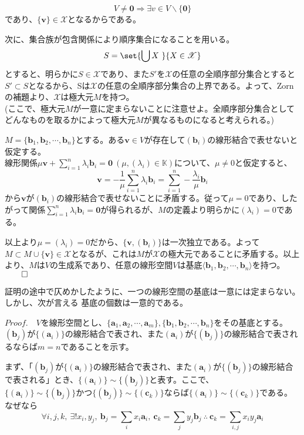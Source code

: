 \documentclass[dvipdfmx]{jsarticle}
\begin{document}
\[V\neq\bm{0}\Rightarrow\exists v \in V\backslash\{\bm{0}\}\]
であり、$\{\bm{v}\}\in\mathscr{X}$となるからである。\par
次に、集合族が包含関係により順序集合になることを用いる。
\[S=\set{\bigcup X~}{X\in\mathscr{X}}\]
とすると、明らかに$S\in\mathscr{X}$であり、また$S'$を$\mathscr{X}$の任意の全順序部分集合とすると$S' \subset S$となるから、Sは$\mathscr{X}$の任意の全順序部分集合の上界である。よって、Zornの補題より、$\mathscr{X}$は極大元$M$を持つ。\\
(ここで、極大元$M$が一意に定まらないことに注意せよ。全順序部分集合としてどんなものを取るかによって極大元$M$が異なるものになると考えられる。)\par
$M=\{\bm{b}_1,\bm{b}_2,\cdots,\bm{b}_n\}$とする。ある$\bm{v} \in V$が存在して$(\bm{b}_i)$の線形結合で表せないと仮定する。\\
線形関係$\mu\bm{v}+\displaystyle\sum_{i=1}^n\lambda_i\bm{b}_i=\bm{0}~(\mu,(\lambda_i)\in\mathbb{K})$について、$\mu\neq0$と仮定すると、
\[\bm{v}=-\frac{1}{\mu}\sum_{i=1}^n\lambda_i\bm{b}_i=\sum_{i=1}^n-\frac{\lambda_i}{\mu}\bm{b}_i\]
から$\bm{v}$が$(\bm{b}_i)$の線形結合で表せないことに矛盾する。従って$\mu=0$であり、したがって関係$\displaystyle\sum_{i=1}^n\lambda_i\bm{b}_i=\bm{0}$が得られるが、$M$の定義より明らかに$(\lambda_i)=0$である。\par
以上より$\mu=(\lambda_i)=0$だから、$\{\bm{v},(\bm{b}_i)\}$は一次独立である。よって$M \subset M \cup \{\bm{v}\} \in \mathscr{X}$となるが、これは$M$が$\mathscr{X}$の極大元であることに矛盾する。以上より、$M$は$V$の生成系であり、任意の線形空間$V$は基底$\langle\bm{b}_1,\bm{b}_2,\cdots,\bm{b}_n\rangle$を持つ。$\qed$\\\par
証明の途中で仄めかしたように、一つの線形空間の基底は一意には定まらない。しかし、次が言える\newpage
{}基底の個数は一意的である。\\\par
$Proof.$　$V$を線形空間とし、$\{\bm{a}_1,\bm{a}_2,\cdots,\bm{a}_m\},\{\bm{b}_1,\bm{b}_2,\cdots,\bm{b}_n\}$をその基底とする。$(\bm{b}_j)$が$\{(\bm{a}_i)\}$の線形結合で表され、また$(\bm{a}_i)$が$\{(\bm{b}_j)\}$の線形結合で表されるならば$m=n$であることを示す。\par
まず、「$(\bm{b}_j)$が$\{(\bm{a}_i)\}$の線形結合で表され、また$(\bm{a}_i)$が$\{(\bm{b}_j)\}$の線形結合で表される」とき、$\{(\bm{a}_i)\}\sim\{(\bm{b}_j)\}$と表す。ここで、$\{(\bm{a}_i)\}\sim\{(\bm{b}_j)\}かつ\{(\bm{b}_j)\}\sim\{(\bm{c}_k)\}$ならば$\{(\bm{a}_i)\}\sim\{(\bm{c}_k)\}$である。なぜなら
\[\forall i,j,k,~\exists! x_i,y_j,~\bm{b}_j=\sum_i x_i\bm{a}_i,~\bm{c}_k=\sum_j y_j\bm{b}_j~\therefore~\bm{c}_k=\sum_{i,j} x_iy_j\bm{a}_i\]
\end{document}
